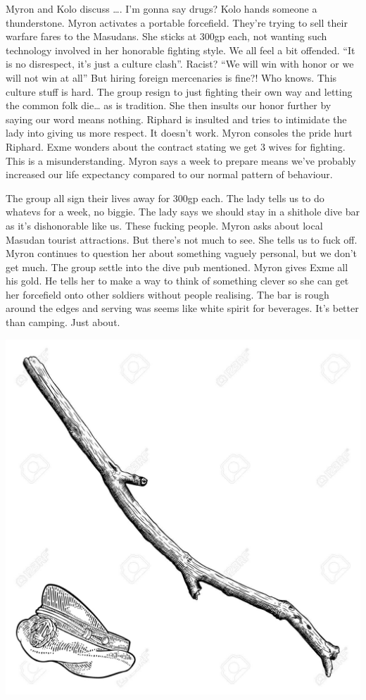 Myron and Kolo discuss …. I’m gonna say drugs? Kolo hands someone a thunderstone. Myron activates a portable forcefield. They’re trying to sell their warfare fares to the Masudans. She sticks at 300gp each, not wanting such technology involved in her honorable fighting style. We all feel a bit offended. “It is no disrespect, it’s just a culture clash”. Racist? “We will win with honor or we will not win at all” But hiring foreign mercenaries is fine?! Who knows. This culture stuff is hard. The group resign to just fighting their own way and letting the common folk die… as is tradition. She then insults our honor further by saying our word means nothing. Riphard is insulted and tries to intimidate the lady into giving us more respect. It doesn’t work. Myron consoles the pride hurt Riphard. Exme wonders about the contract stating we get 3 wives for fighting. This is a misunderstanding. Myron says a week to prepare means we’ve probably increased our life expectancy compared to our normal pattern of behaviour.\medskip

The group all sign their lives away for 300gp each. The lady tells us to do whatevs for a week, no biggie. The lady says we should stay in a shithole dive bar as it’s dishonorable like us. These fucking people. Myron asks about local Masudan tourist attractions. But there’s not much to see. She tells us to fuck off. Myron continues to question her about something vaguely personal, but we don’t get much. The group settle into the dive pub mentioned. Myron gives Exme all his gold. He tells her to make a way to think of something clever so she can get her forcefield onto other soldiers without people realising. The bar is rough around the edges and serving was seems like white spirit for beverages. It’s better than camping. Just about.\medskip



\vspace*{5mm}

\begin{center}
\includegraphics[width=\textwidth]{./content/img/xxx.jpg}
\begin{figure}[h]
\end{figure}
\end{center}

\clearpage